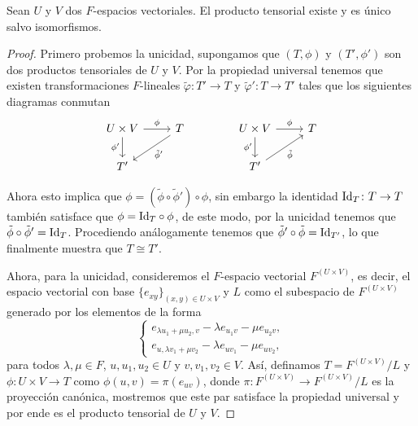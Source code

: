 \begin{theorem}
  Sean $U$ y $V$ dos $F$-espacios vectoriales. El producto tensorial existe y es único salvo isomorfismos.
\end{theorem}
\begin{proof}
  Primero probemos la unicidad, supongamos que $(T, \phi)$ y $(T', \phi')$ son dos productos tensoriales de $U$ y $V$. Por la propiedad universal tenemos que existen transformaciones $F$-lineales $\tilde\varphi\colon T' \to T$ y $\tilde\varphi'\colon T \to T'$ tales que los siguientes diagramas conmutan
  \[
    \begin{tikzcd}
      U \times V \arrow[r, "\phi"] \arrow[d, "\phi'"'] & T \arrow[ld, "\tilde \phi'"] \\
      T'                                               &                             
    \end{tikzcd}
      \qquad\qquad
    \begin{tikzcd}
      U \times V \arrow[r, "\phi"] \arrow[d, "\phi'"'] & T \\
      T' \arrow[ru, "\tilde\phi"']                     &  
    \end{tikzcd}
  \]

  Ahora esto implica que $\phi = (\tilde \phi \circ \tilde \phi' ) \circ \phi$, sin embargo la identidad $\mathrm{Id}_{T} \colon T \to T$ también satisface que $\phi = \mathrm{Id}_T \circ \phi$, de este modo, por la unicidad tenemos que $\tilde \phi \circ \tilde \phi' = \mathrm{Id}_T$. Procediendo análogamente tenemos que $\tilde \phi' \circ \tilde \phi = \mathrm{Id}_{T'}$, lo que finalmente muestra que $T \cong T'$.

  Ahora, para la unicidad, consideremos el $F$-espacio vectorial $F^{(U \times V)}$, es decir, el espacio vectorial con base $\{e_{xy}\}_{(x,y) \in U \times V}$ y $L$ como el subespacio de $F^{(U \times V)}$ generado por los elementos de la forma
  \[
    \begin{cases}
      e_{\lambda u_1 + \mu u_2, v} - \lambda e_{u_1 v} - \mu e_{u_2 v}, \\
      e_{u, \lambda v_1 + \mu v_2} - \lambda e_{u v_1} - \mu e_{u v_2},
    \end{cases}
  \]
  para todos $\lambda, \mu\in F$, $u, u_1, u_2 \in U$ y $v, v_1, v_2 \in V$. Así, definamos $T = F^{(U \times V)}/L$ y $\phi\colon U \times V \to  T$ como $\phi(u,v) = \pi(e_{uv})$, donde $\pi \colon F^{(U \times V)} \to F^{(U \times V)}/L$ es la proyección canónica, mostremos que este par satisface la propiedad universal y por ende es el producto tensorial de $U$ y $V$.


\end{proof}
